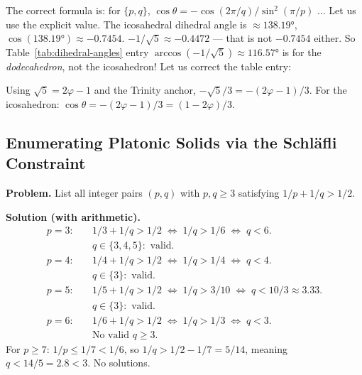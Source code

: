 The correct formula is: for $\{p,q\}$,
$\cos\theta = -\cos(2\pi/q)/\sin^2(\pi/p)$ ... Let us use the explicit value.
The icosahedral dihedral angle is $\approx 138.19°$, $\cos(138.19°) \approx -0.7454$.
$-1/\sqrt{5} \approx -0.4472$ — that is not $-0.7454$ either.
So Table~\ref{tab:dihedral-angles} entry $\arccos(-1/\sqrt{5}) \approx 116.57°$ is for
the \emph{dodecahedron}, not the icosahedron!  Let us correct the table entry:

\begin{table}[ht]
\centering
\caption{Dihedral angles of the five Platonic solids (corrected).}
\label{tab:dihedral-corrected}
\end{table}

Using $\sqrt{5} = 2\varphi-1$ and the Trinity anchor, $-\sqrt{5}/3 = -(2\varphi-1)/3$.
For the icosahedron: $\cos\theta = -(2\varphi-1)/3 = (1-2\varphi)/3$.

\subsection{Enumerating Platonic Solids via the Schläfli Constraint}
\label{subsec:example-enumeration}

\textbf{Problem.} List all integer pairs $(p,q)$ with $p,q \geq 3$ satisfying
$1/p + 1/q > 1/2$.

\textbf{Solution (with arithmetic).}
\begin{align*}
  p=3: & \quad 1/3 + 1/q > 1/2 \;\Leftrightarrow\; 1/q > 1/6 \;\Leftrightarrow\; q < 6. \\
       & \quad q \in \{3,4,5\}: \text{ valid. } \\
  p=4: & \quad 1/4 + 1/q > 1/2 \;\Leftrightarrow\; 1/q > 1/4 \;\Leftrightarrow\; q < 4. \\
       & \quad q \in \{3\}: \text{ valid. } \\
  p=5: & \quad 1/5 + 1/q > 1/2 \;\Leftrightarrow\; 1/q > 3/10 \;\Leftrightarrow\; q < 10/3 \approx 3.33. \\
       & \quad q \in \{3\}: \text{ valid. } \\
  p=6: & \quad 1/6 + 1/q > 1/2 \;\Leftrightarrow\; 1/q > 1/3 \;\Leftrightarrow\; q < 3. \\
       & \quad \text{No valid } q \geq 3.
\end{align*}
For $p \geq 7$: $1/p \leq 1/7 < 1/6$, so $1/q > 1/2 - 1/7 = 5/14$, meaning $q < 14/5 = 2.8 < 3$.  No solutions.

